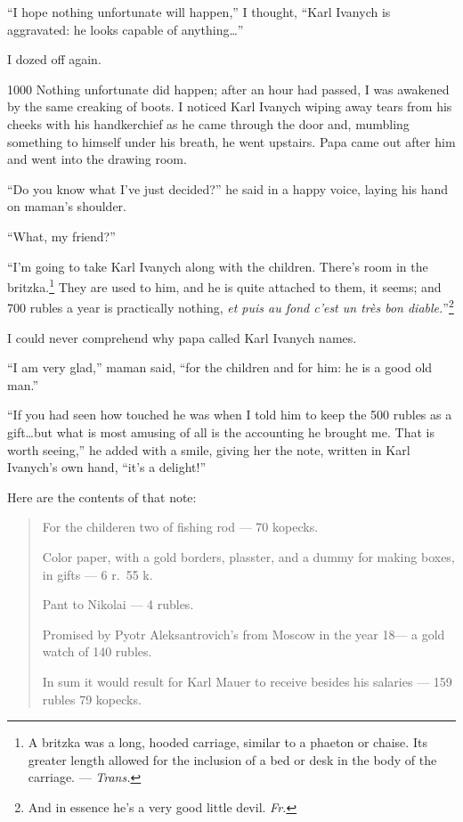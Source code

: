 ``I hope nothing unfortunate will happen,'' I thought, ``Karl Ivanych is aggravated: he looks capable of anything\ldots{}'' %

I dozed off again.

\begin{tolerant}{1000}
Nothing unfortunate did happen; after an hour had passed, I was awakened by the same creaking of boots. I noticed Karl Ivanych wiping away tears from his cheeks with his handkerchief as he came through the door and, mumbling something to himself under his breath, he went upstairs. Papa came out after him and went into the drawing room.
\end{tolerant}

``Do you know what I've just decided?'' he said in a happy voice, laying his hand on maman's shoulder. %

``What, my friend?'' %

``I'm going to take Karl Ivanych along with the children. There's room in the britzka.\footnote{A britzka was a long, hooded carriage, similar to a phaeton or chaise. Its greater length allowed for the inclusion of a bed or desk in the body of the carriage. --- \textit{Trans.}} They are used to him, and he is quite attached to them, it seems; and 700 rubles a year is practically nothing, \textit{et puis au fond c'est un tr\`es bon diable.}''\footnote{And in essence he's a very good little devil. \textit{Fr.}} %

I could never comprehend why papa called Karl Ivanych names.

``I am very glad,'' maman said, ``for the children and for him: he is a good old man.'' %

``If you had seen how touched he was when I told him to keep the 500 rubles as a gift\ldots{}but what is most amusing of all is the accounting he brought me. That is worth seeing,'' he added with a smile, giving her the note, written in Karl Ivanych's own hand, ``it's a delight!'' %

Here are the contents of that note:

\begin{quotation}
For the childeren two of fishing rod --- 70 kopecks.

Color paper, with a gold borders, plasster, and a dummy for making boxes, in gifts --- 6 r.~55 k.

Pant to Nikolai --- 4 rubles.

Promised by Pyotr Aleksantrovich's from Moscow in the year 18--- a gold watch of 140 rubles.

In sum it would result for Karl Mauer to receive besides his salaries --- 159 rubles 79 kopecks. %
\end{quotation}

